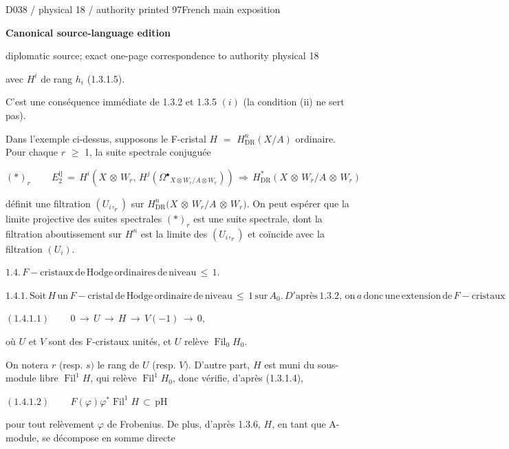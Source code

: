 \documentclass[9pt]{article}
\newcommand{\CanonText}[1]{\par{\fontsize{8.0}{9.35}\selectfont\RaggedRight #1\par}\vspace{2.2pt}}
\newcommand{\CanonDisplay}[1]{\par\vspace{1.2pt}\begin{center}{\fontsize{7.2}{8.4}\selectfont\(\displaystyle #1\)}\end{center}\vspace{1.2pt}}
\newcommand{\LayerTitle}{Canonical source-language edition}
\begin{document}
\noindent\begin{minipage}[t][\dimexpr\textheight-5pt\relax][t]{\textwidth}
{\sffamily\fontsize{7.3}{8.2}\selectfont\color{Quiet} D038 / physical 18 / authority printed 97\hfill French main exposition}
\par{}\vspace{4.5pt}
{\sffamily\fontsize{10.4}{11.6}\selectfont\bfseries\color{Accent} \LayerTitle}
\par{\sffamily\fontsize{6.7}{7.7}\selectfont\color{Quiet} diplomatic source; exact one-page correspondence to authority physical 18}
\vspace{5pt}
\CanonText{avec \(H^{i}\) de rang \(h_{i}\) (1.3.1.5).}
\CanonText{C'est une conséquence immédiate de 1.3.2 et 1.3.5 \((i)\) (la condition (ii) ne sert pas).}
\CanonText{Dans l'exemple ci-dessus, supposons le F-cristal \(H\) \(=\) \(H^{n}_{\mathrm{DR}}(X/A)\) ordinaire. Pour chaque \(r\) \(\geq{}\) 1, la suite spectrale conjuguée}
\CanonDisplay{(*)_{r}\qquad\,E_{2}^{\mathrm{ij}}\,=\,H^{i}(X\,\otimes{}\,W_{r},\,H^{j}(\Omega{}^\bullet{}_{X\otimes{}W_{r}/A\otimes{}W_{r}}))\,\Rightarrow{}\,H^{*}_{\mathrm{DR}}(X\,\otimes{}\,W_{r}/A\,\otimes{}\,W_{r})}
\CanonText{définit une filtration \((U_{i},_{r})\) sur \(H^{n}_{\mathrm{DR}}(X\) \(\otimes{}\) \(W_{r}/A\) \(\otimes{}\) \(W_{r})\). On peut espérer que la limite projective des suites spectrales \((*)_{r}\) est une suite spectrale, dont la filtration aboutissement sur \(H^{n}\) est la limite des \((U_{i},_{r})\) et coïncide avec la filtration \((U_{i})\).}
\CanonDisplay{1.4.\,F-\text{cristaux}\,\text{de}\,\text{Hodge}\,\text{ordinaires}\,\text{de}\,\text{niveau}\,\leq{}\,1.}
\CanonDisplay{1.4.1.\,\text{Soit}\,H\,\text{un}\,F-\text{cristal}\,\text{de}\,\text{Hodge}\,\text{ordinaire}\,\text{de}\,\text{niveau}\,\leq{}\,1\,\text{sur}\,A_{0}.\,D'\text{après}\,1.3.2,\,\text{on}\,a\,\text{donc}\,\text{une}\,\text{extension}\,\text{de}\,F-\text{cristaux}}
\CanonDisplay{(1.4.1.1)\qquad\,0\,\to{}\,U\,\to{}\,H\,\to{}\,V(-1)\,\to{}\,0,}
\CanonText{où \(U\) et \(V\) sont des F-cristaux unités, et \(U\) relève \(\operatorname{Fil}_{0}H_{0}\).}
\CanonText{On notera \(r\) (resp. \(s)\) le rang de \(U\) (resp. \(V)\). D'autre part, \(H\) est muni du sous-module libre \(\operatorname{Fil}^{1}H\), qui relève \(\operatorname{Fil}^{1}H_{0}\), donc vérifie, d'après (1.3.1.4),}
\CanonDisplay{(1.4.1.2)\qquad\,F(\varphi{})\varphi{}^{*}\operatorname{Fil}^{1}H\,\subset{}\,\text{pH}}
\CanonText{pour tout relèvement \(\varphi{}\) de Frobenius. De plus, d'après 1.3.6, \(H\), en tant que A-module, se décompose en somme directe}

\end{minipage}
\end{document}
